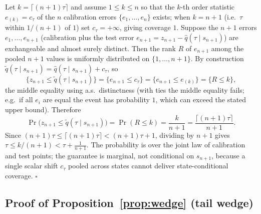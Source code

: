 \documentclass[11pt]{article}
\theoremstyle{remark}
\begin{document}
Let $k=\lceil(n{+}1)\tau\rceil$ and assume $1\le k\le n$ so that the
$k$-th order statistic $e_{(k)}=c_\tau$ of the $n$ calibration errors
$\{e_1,\dots,e_n\}$ exists; when $k=n+1$ (i.e.\ $\tau$ within $1/(n+1)$
of $1$) set $c_\tau=+\infty$, giving coverage $1$. Suppose the $n+1$
errors $e_1,\dots,e_{n+1}$ (calibration plus the test error
$e_{n+1}=z_{n+1}-\widehat q(\tau\mid s_{n+1})$) are exchangeable and
almost surely distinct. Then the rank $R$ of $e_{n+1}$ among the pooled
$n+1$ values is uniformly distributed on $\{1,\dots,n+1\}$. By
construction $\widetilde q(\tau\mid s_{n+1})=\widehat q(\tau\mid
s_{n+1})+c_\tau$, so
\[
\{z_{n+1}\le\widetilde q(\tau\mid s_{n+1})\}
=\{e_{n+1}\le c_\tau\}
=\{e_{n+1}\le e_{(k)}\}
=\{R\le k\},
\]
the middle equality using a.s.\ distinctness (with ties the middle
equality fails; e.g.\ if all $e_i$ are equal the event has probability
$1$, which can exceed the stated upper bound). Therefore
\[
\Pr\big(z_{n+1}\le\widetilde q(\tau\mid s_{n+1})\big)
=\Pr(R\le k)=\frac{k}{n+1}
=\frac{\lceil(n{+}1)\tau\rceil}{n+1}.
\]
Since $(n{+}1)\tau\le\lceil(n{+}1)\tau\rceil<(n{+}1)\tau+1$, dividing by
$n+1$ gives $\tau\le k/(n+1)<\tau+\tfrac1{n+1}$. The probability is over
the joint law of calibration and test points; the guarantee is
marginal, not conditional on $s_{n+1}$, because a single scalar shift
$c_\tau$ pooled across states cannot deliver state-conditional
coverage. \hfill$\square$

\subsection*{Proof of Proposition~\ref{prop:wedge} (tail wedge)}
\end{document}

